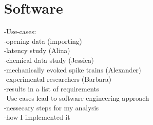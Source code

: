 \chapter{Software}

-Use-cases:\\
	\null\quad-opening data (importing)\\
	\null\quad-latency study (Alina)\\
	\null\quad-chemical data study (Jessica)\\
	\null\quad-mechanically evoked spike trains (Alexander)\\
	\null\quad-experimental researchers (Barbara)\\
-results in a list of requirements\\
-Use-cases lead to software engineering approach\\
-nessecary steps for my analysis\\
-how I implemented it

\begin{comment}
My steps in analysis: 

First, I used a jupyter notebook from Radomir. For this the data needed to be extracted from Spike2 directly in the Software. This export step leads to a single csv file for one recording with 5 channels: Time, Signal, Force, DigMark(stimulation events), Spikes 

Using the cev files I could extract the spike trains for each mechanical stimulation. The detection of the spike train worked as follows: The start of the spike train gets determined by the stimulation event. The length of the spike train is a previously set amount of time (in most cases 500ms). During this timeframe all spikes in the spike channel get put into a list that keeps track of the spike trains. This pretty basic detection of spike trains works well in this specific use case but has its limits when it comes to other kinds of data with other experimental protocols or just simply recordings without any protocols. Then because we do not have the exact starting points of the trains or bursting patterns this method of detection falls flat. 

This first jupyter notebook already made use of what later became openMNGlab. The import of the data was handled by the software framework. However, openMNGlab got some updates soon after which made some significant changes to how the importers work. In the new and improved framework, the importer worked on the original Spike2 files instead of the extracted csv files. This allows for more detailed representation of the data since much of the information was lost in the extraction before this update. However, with this new way of importing the data the mechanical stimulation was not able to be extracted. I still needed the information of the mechanical stimulation which was only contained in the extracted csv file. For this reason, in my analysis from here on, I used a hybrid of the old and new versions of openMNGlab until I was able to fix the new importer to also include the mechanical stimulation channel. 
\end{comment}

\cleardoublepage
